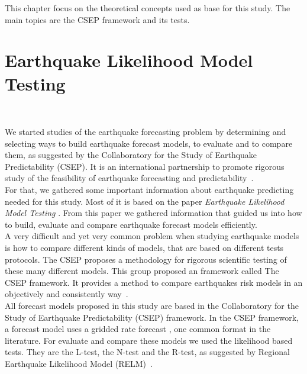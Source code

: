 This chapter focus on the theoretical concepts used as base for this study. The main topics are the CSEP framework and its tests.\\

\section{Earthquake Likelihood Model Testing}~\label{testing}

We started studies of the earthquake forecasting problem by determining and selecting ways to build earthquake forecast models, to evaluate and to compare them, as suggested by the Collaboratory for the Study of Earthquake Predictability (CSEP). It is an international partnership to promote rigorous study of the feasibility of earthquake forecasting and predictability~\cite{ecta14}.\\

For that, we gathered some important information about earthquake predicting needed for this study. Most of it is based on the paper {\it Earthquake Likelihood Model Testing} \cite{schorlemmer2007earthquake}. From this paper we gathered information that guided us into how to build, evaluate and compare earthquake forecast models efficiently.\\

A very difficult and yet very common problem when studying earthquake models is how to compare different kinds of models, that are based on different tests protocols. The CSEP proposes a methodology for rigorous scientific testing of these many different models. This group proposed an framework called The CSEP framework. It provides a method to compare earthquakes risk models in an objectively and consistently way~\cite{ecta14}.\\

All forecast models proposed in this study are based in the Collaboratory for the Study of Earthquake Predictability (CSEP) framework. In the CSEP framework, a forecast model uses a gridded rate forecast \cite{zechar2010evaluating}, one common format in the literature. For evaluate and compare these models we used the likelihood based tests. They are the L-test, the N-test and the R-test, as suggested by Regional Earthquake Likelihood Model (RELM)~\cite{schorlemmer2007earthquake}.\\

